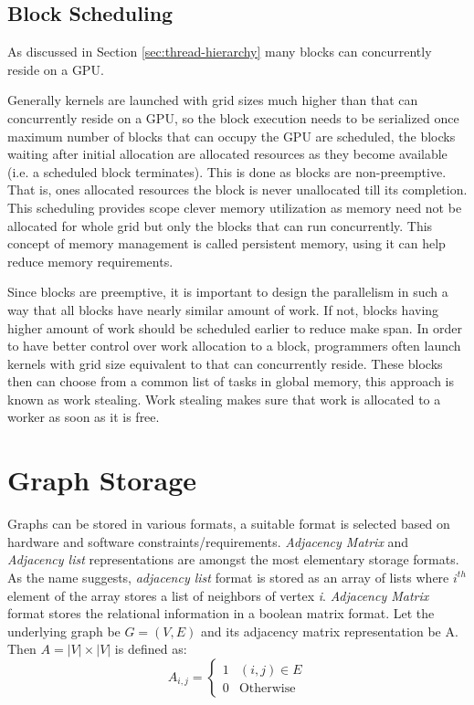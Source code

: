 \subsection{Block Scheduling}\label{sec:block-scheduling}
As discussed in Section \ref{sec:thread-hierarchy} many blocks can concurrently reside on a GPU.

Generally kernels are launched with grid sizes much higher than that can concurrently reside on a GPU, so the block execution needs to be serialized once maximum number of blocks that can occupy the GPU are scheduled, the blocks waiting after initial allocation are allocated resources as they become available (i.e. a scheduled block terminates).
This is done as blocks are non-preemptive. That is, ones allocated resources the block is never unallocated till its completion.
This scheduling provides scope clever memory utilization as memory need not be allocated for whole grid but only the blocks that can run concurrently. This concept of memory management is called persistent memory, using it can help reduce memory requirements.

Since blocks are preemptive, it is important to design the parallelism in such a way that all blocks have nearly similar amount of work.
If not, blocks having higher amount of work should be scheduled earlier to reduce make span.
In order to have better control over work allocation to a block, programmers often launch kernels with grid size equivalent to that can concurrently reside.
These blocks then can choose from a common list of tasks in global memory, this approach is known as work stealing.
Work stealing makes sure that work is allocated to a worker as soon as it is free.



\section{Graph Storage}\label{storage-format}
Graphs can be stored in various formats, a suitable format is selected based on hardware and software constraints/requirements.
\textit{Adjacency Matrix} and \textit{Adjacency list} representations are amongst the most elementary storage formats.
As the name suggests, \textit{adjacency list} format is stored as an array of lists where $i^{th}$ element of the array stores a list of neighbors of vertex \textit{i}.
\textit{Adjacency Matrix} format stores the relational information in a boolean matrix format.
Let the underlying graph be $G=(V,E)$ and its adjacency matrix representation be A.
Then $A = |V|\times|V|$ is defined as:
$$
    A_{i,j}=\begin{cases}
        1 & (i,j) \in E      \\
        0 & \text{Otherwise}
    \end{cases}
$$

